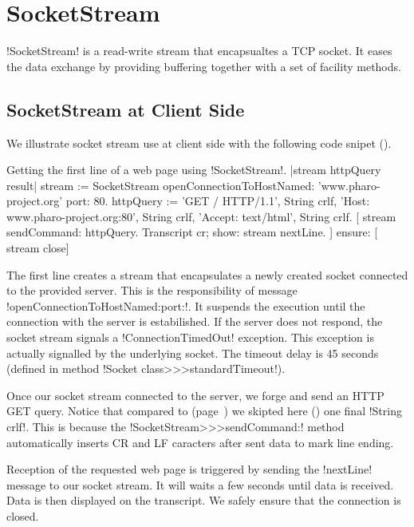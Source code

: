 \documentclass[a4paper,10pt,twoside]{book}
\begin{document}
\section{SocketStream}
\label{sec:socketStream}
\ct!SocketStream! is a read-write stream that encapsualtes a TCP socket.
It eases the data exchange by providing buffering together with a set of facility methods.

\subsection{SocketStream at Client Side}
We illustrate socket stream use at client side with the following code snipet ().

\begin{script}{Getting the first line of a web page using \ct!SocketStream!.}
	|stream httpQuery result|
	stream := SocketStream 
			openConnectionToHostNamed: 'www.pharo-project.org' 
			port: 80.
	httpQuery := 'GET / HTTP/1.1', String crlf, 
		'Host: www.pharo-project.org:80', String crlf, 
		'Accept: text/html', String crlf.
	[
		stream sendCommand: httpQuery.
		Transcript cr; show: stream nextLine.
	] ensure: [
		stream close]
\end{script}

The first line creates a stream that encapsulates a newly created socket connected to the provided server.
This is the responsibility of message \ct!openConnectionToHostNamed:port:!.
It suspends the execution until the connection with the server is estabilished.
If the server does not respond, the socket stream signals a \ct!ConnectionTimedOut! exception.
This exception is actually signalled by the underlying socket.
The timeout delay is 45 seconds (defined in method \ct!Socket class>>>standardTimeout!).

Once our socket stream connected to the server, we forge and send an HTTP GET query.
Notice that compared to  (page~\pageref{scr:script:closeAndDestroy}) we skipted here () one final \ct!String crlf!.
This is because the \ct!SocketStream>>>sendCommand:! method automatically inserts CR and LF caracters after sent data to mark line ending.

Reception of the requested web page is triggered by sending the \ct!nextLine! message to our socket stream.
It will waits a few seconds until data is received.
Data is then displayed on the transcript.
We safely ensure that the connection is closed.
\end{document}

